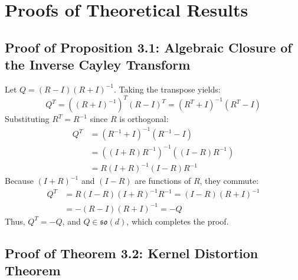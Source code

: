 \section{Proofs of Theoretical Results}
\label{sec:appendix_proofs}

\subsection{Proof of Proposition 3.1: Algebraic Closure of the Inverse Cayley Transform}
\label{proof:proposition_closure}

Let $Q = (R - I)(R + I)^{-1}$. Taking the transpose yields:
\begin{equation*}
Q^T = \left( (R + I)^{-1} \right)^T (R - I)^T = (R^T + I)^{-1} (R^T - I)
\end{equation*}
Substituting $R^T = R^{-1}$ since $R$ is orthogonal:
\begin{align*}
Q^T &= (R^{-1} + I)^{-1} (R^{-1} - I) \\
&= \left( (I + R)R^{-1} \right)^{-1} \left( (I - R)R^{-1} \right) \\
&= R (I + R)^{-1} (I - R) R^{-1}
\end{align*}
Because $(I + R)^{-1}$ and $(I - R)$ are functions of $R$, they commute:
\begin{align*}
Q^T &= R (I - R) (I + R)^{-1} R^{-1} = (I - R) (R + I)^{-1} \\
&= - (R - I) (R + I)^{-1} = -Q
\end{align*}
Thus, $Q^T = -Q$, and $Q \in \mathfrak{so}(d)$, which completes the proof.

\subsection{Proof of Theorem 3.2: Kernel Distortion Theorem}
\label{proof:theorem_distortion}

